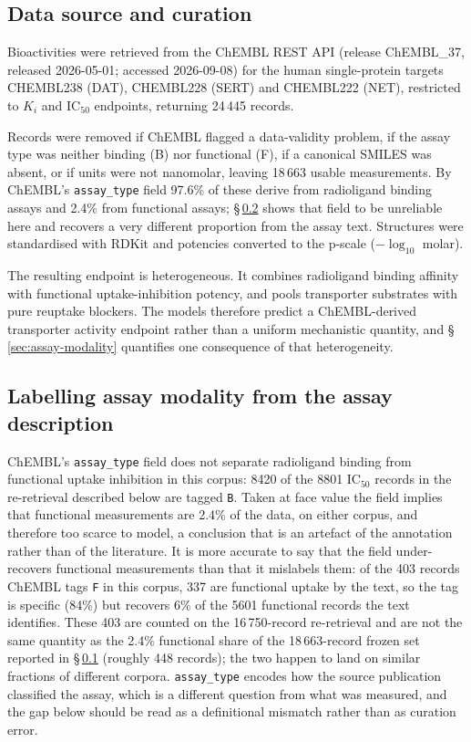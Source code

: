 \documentclass[11pt,a4paper]{article}
\begin{document}
\subsection{Data source and curation}
\label{sec:data}
\begin{sloppypar}
Bioactivities were retrieved from the ChEMBL REST API (release ChEMBL\_37, released
2026-05-01; accessed 2026-09-08) for the human single-protein targets CHEMBL238 (DAT),
CHEMBL228 (SERT) and CHEMBL222 (NET), restricted to $K_i$ and IC$_{50}$ endpoints,
returning 24\,445 records.\cite{Zdrazil2024,Davies2015}
\end{sloppypar}

Records were removed if ChEMBL flagged a data-validity problem, if the assay type was
neither binding (B) nor functional (F), if a canonical SMILES was absent, or if units
were not nanomolar, leaving 18\,663 usable measurements. By ChEMBL's
\texttt{assay\_type} field 97.6\% of these derive from radioligand binding assays and
2.4\% from functional assays; \S\,\ref{sec:modality-labelling} shows that field to be
unreliable here and recovers a very different proportion from the assay text.
Structures were standardised with RDKit \cite{RDKit} and potencies converted to the
p-scale ($-\log_{10}$ molar).

The resulting endpoint is heterogeneous. It combines radioligand binding affinity
with functional uptake-inhibition potency, and pools transporter substrates with
pure reuptake blockers. The models therefore predict a ChEMBL-derived transporter
activity endpoint rather than a uniform mechanistic quantity, and
\S\,\ref{sec:assay-modality} quantifies
one consequence of that heterogeneity.

\subsection{Labelling assay modality from the assay description}
\label{sec:modality-labelling}
ChEMBL's \texttt{assay\_type} field does not separate radioligand binding from
functional uptake inhibition in this corpus: 8420 of the 8801 IC$_{50}$ records in the
re-retrieval described below are tagged \texttt{B}. Taken at face value the field implies that functional measurements
are 2.4\% of the data, on either corpus, and therefore too scarce to model, a conclusion that is an
artefact of the annotation rather than of the literature. It is more accurate to say that
the field under-recovers functional measurements than that it mislabels them: of the 403
records ChEMBL tags \texttt{F} in this corpus, 337 are functional uptake by the text, so
the tag is specific (84\%) but recovers 6\% of the 5601 functional records the text
identifies. These 403 are counted on the 16\,750-record re-retrieval and are not the same
quantity as the 2.4\% functional share of the 18\,663-record frozen set reported in
\S\,\ref{sec:data} (roughly 448 records); the two happen to land on similar fractions of
different corpora. \texttt{assay\_type} encodes how the source publication classified the assay,
which is a different question from what was measured, and the gap below should be read as
a definitional mismatch rather than as curation error.
\end{document}
